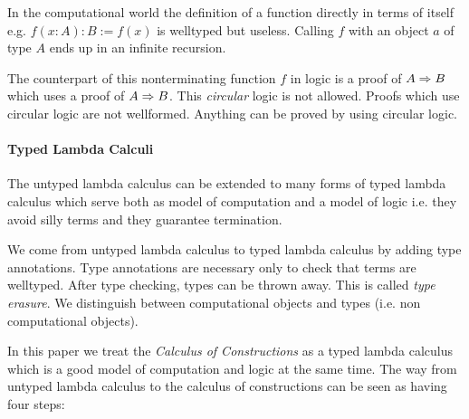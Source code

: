 In the computational world the definition of a function directly in terms of
itself e.g.  $f(x: A): B := f(x)$ is welltyped but useless. Calling $f$ with an
object $a$ of type $A$ ends up in an infinite recursion.

The counterpart of this nonterminating function $f$ in logic is a proof of $A
\Rightarrow B$ which uses a proof of $A \Rightarrow B$. This \emph{circular} logic is not
allowed. Proofs which use circular logic are not wellformed. Anything can be
proved by using circular logic.




\paragraph{Typed Lambda Calculi}
The untyped lambda calculus can be extended to many forms of typed lambda
calculus which serve both as model of computation and a model of logic i.e.
they avoid silly terms and they guarantee termination.

We come from untyped lambda calculus to typed lambda calculus by adding type
annotations. Type annotations are necessary only to check that terms are
welltyped. After type checking, types can be thrown away. This is called
\emph{type erasure}. We distinguish between computational objects and types
(i.e. non computational objects).

In this paper we treat the \emph{Calculus of Constructions} as a typed
lambda calculus which is a good model of computation and logic at the same time.
The way from untyped lambda calculus to the calculus of constructions can be
seen as having four steps:




